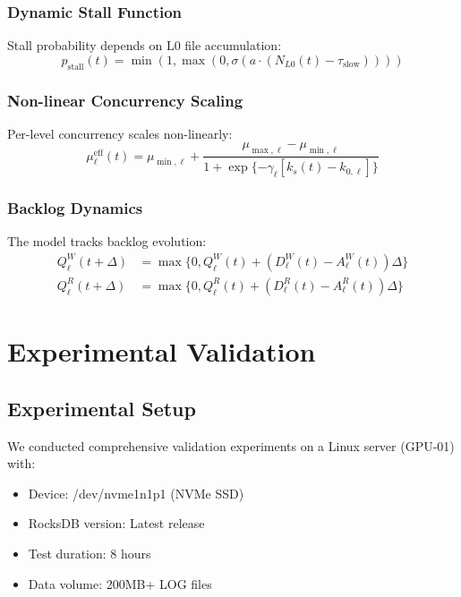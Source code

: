 \documentclass[11pt,twocolumn]{article}
\newcommand{\pstall}{p_{\text{stall}}}
\newcommand{\mueff}{\mu^{\text{eff}}}
\begin{document}
\subsubsection{Dynamic Stall Function}
Stall probability depends on L0 file accumulation:
\begin{equation}
\pstall(t) = \min(1, \max(0, \sigma(a \cdot (N_{L0}(t) - \tau_{\text{slow}}))))
\end{equation}

\subsubsection{Non-linear Concurrency Scaling}
Per-level concurrency scales non-linearly:
\begin{equation}
\mueff_\ell(t) = \mu_{\min,\ell} + \frac{\mu_{\max,\ell} - \mu_{\min,\ell}}{1 + \exp\{-\gamma_\ell [k_s(t) - k_{0,\ell}]\}}
\end{equation}

\subsubsection{Backlog Dynamics}
The model tracks backlog evolution:
\begin{align}
Q^W_\ell(t+\Delta) &= \max\{0, Q^W_\ell(t) + (D^W_\ell(t) - A^W_\ell(t)) \Delta\} \\
Q^R_\ell(t+\Delta) &= \max\{0, Q^R_\ell(t) + (D^R_\ell(t) - A^R_\ell(t)) \Delta\}
\end{align}

\section{Experimental Validation}

\subsection{Experimental Setup}

We conducted comprehensive validation experiments on a Linux server (GPU-01) with:
\begin{itemize}
    \item Device: /dev/nvme1n1p1 (NVMe SSD)
    \item RocksDB version: Latest release
    \item Test duration: 8 hours
    \item Data volume: 200MB+ LOG files
\end{itemize}
\end{document}
